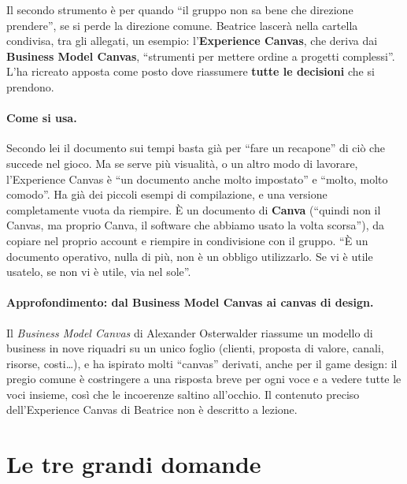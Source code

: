

Il secondo strumento è per quando ``il gruppo non sa bene che direzione prendere'',
se si perde la direzione comune. Beatrice lascerà nella cartella condivisa, tra gli
allegati, un esempio: l'\textbf{Experience Canvas}, che deriva dai \textbf{Business
Model Canvas}, ``strumenti per mettere ordine a progetti complessi''. L'ha ricreato
apposta come posto dove riassumere \textbf{tutte le decisioni} che si prendono.

\paragraph{Come si usa.} Secondo lei il documento sui tempi basta già per ``fare un
recapone'' di ciò che succede nel gioco. Ma se serve più visualità, o un altro modo di
lavorare, l'Experience Canvas è ``un documento anche molto impostato'' e ``molto, molto
comodo''. Ha già dei piccoli esempi di compilazione, e una versione completamente
vuota da riempire. È un documento di \textbf{Canva} (``quindi non il Canvas, ma
proprio Canva, il software che abbiamo usato la volta scorsa''), da copiare nel
proprio account e riempire in condivisione con il gruppo. ``È un documento operativo,
nulla di più, non è un obbligo utilizzarlo. Se vi è utile usatelo, se non vi è utile,
via nel sole''.

\paragraph{Approfondimento: dal Business Model Canvas ai canvas di design.} Il
\emph{Business Model Canvas} di Alexander Osterwalder riassume un modello di business
in nove riquadri su un unico foglio (clienti, proposta di valore, canali, risorse,
costi\ldots), e ha ispirato molti ``canvas'' derivati, anche per il game design: il
pregio comune è costringere a una risposta breve per ogni voce e a vedere tutte le
voci insieme, così che le incoerenze saltino all'occhio. Il contenuto preciso
dell'Experience Canvas di Beatrice non è descritto a lezione.

\section{Le tre grandi domande}
\label{a9:sec:tredomande}

